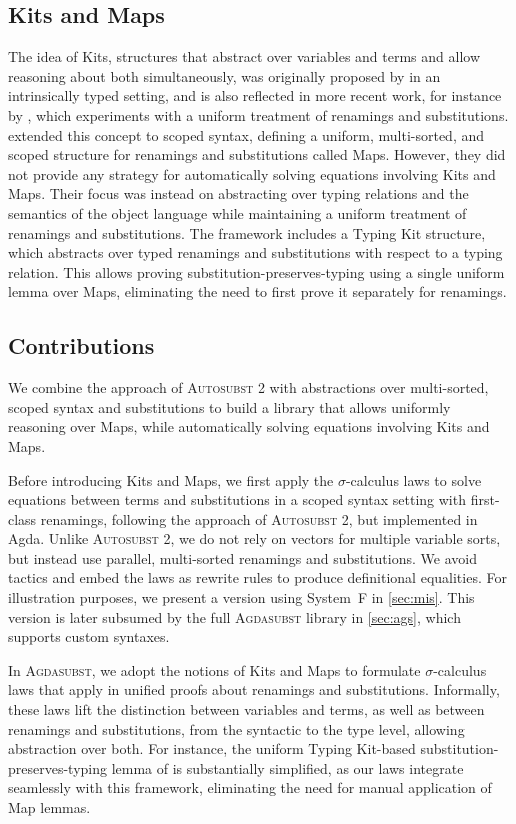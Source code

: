 \documentclass[screen,nonacm]{acmart}
\begin{document}
\subsection{Kits and Maps}
The idea of Kits, structures that abstract over variables and terms and allow
reasoning about both simultaneously, was originally proposed by \citet{ren-sub}
in an intrinsically typed setting, and is also reflected in more recent work,
for instance by \citet{altenkirch2025substitution}, which experiments with a
uniform treatment of renamings and substitutions.
\citet{saffrich:LIPIcs.ITP.2024.32} extended this concept to scoped syntax,
defining a uniform, multi-sorted, and scoped structure for renamings and
substitutions called Maps. However, they did not provide any strategy for
automatically solving equations involving Kits and Maps. Their focus was
instead on abstracting over typing relations and the semantics of the object
language while maintaining a uniform treatment of renamings and substitutions.
The framework includes a Typing Kit structure, which abstracts over typed
renamings and substitutions with respect to a typing relation. This allows
proving substitution-preserves-typing using a single uniform lemma over Maps,
eliminating the need to first prove it separately for renamings.

\subsection{Contributions}
We combine the approach of \textsc{Autosubst 2} with abstractions over
multi-sorted, scoped syntax and substitutions to build a library that allows
uniformly reasoning over Maps, while automatically solving equations involving
Kits and Maps.

Before introducing Kits and Maps, we first apply the $σ$-calculus laws to solve
equations between terms and substitutions in a scoped syntax setting with
first-class renamings, following the approach of \textsc{Autosubst 2}, but
implemented in Agda. Unlike \textsc{Autosubst 2}, we do not rely on vectors for
multiple variable sorts, but instead use parallel, multi-sorted renamings and
substitutions. We avoid tactics and embed the laws as rewrite rules to produce
definitional equalities. For illustration purposes, we present a version using
System~F in \cref{sec:mis}. This version is later subsumed by the full
\textsc{Agdasubst} library in \cref{sec:ags}, which supports custom syntaxes.

In \textsc{Agdasubst}, we adopt the notions of Kits and Maps to formulate
$σ$-calculus laws that apply in unified proofs about renamings and
substitutions. Informally, these laws lift the distinction between variables
and terms, as well as between renamings and substitutions, from the syntactic
to the type level, allowing abstraction over both. For instance, the uniform
Typing Kit-based substitution-preserves-typing lemma of
\citet{saffrich:LIPIcs.ITP.2024.32} is substantially simplified, as our laws
integrate seamlessly with this framework, eliminating the need for manual
application of Map lemmas.
\end{document}

